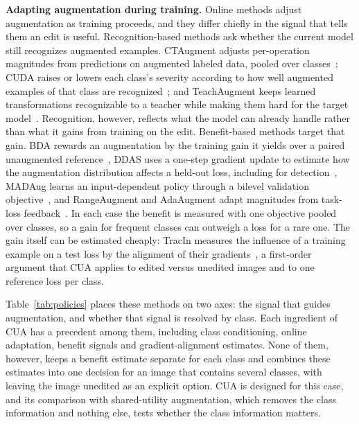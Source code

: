 \documentclass[conference]{IEEEtran}
\begin{document}
\noindent\textbf{Adapting augmentation during training.} Online methods adjust augmentation as training proceeds, and they differ chiefly in the signal that tells them an edit is useful. Recognition-based methods ask whether the current model still recognizes augmented examples. CTAugment adjusts per-operation magnitudes from predictions on augmented labeled data, pooled over classes~\cite{berthelot2020}; CUDA raises or lowers each class's severity according to how well augmented examples of that class are recognized~\cite{ahn2023cuda}; and TeachAugment keeps learned transformations recognizable to a teacher while making them hard for the target model~\cite{suzuki2022teach}. Recognition, however, reflects what the model can already handle rather than what it gains from training on the edit. Benefit-based methods target that gain. BDA rewards an augmentation by the training gain it yields over a paired unaugmented reference~\cite{lu2023bda}, DDAS uses a one-step gradient update to estimate how the augmentation distribution affects a held-out loss, including for detection~\cite{liu2021ddas}, MADAug learns an input-dependent policy through a bilevel validation objective~\cite{hou2023madaug}, and RangeAugment and AdaAugment adapt magnitudes from task-loss feedback~\cite{mehta2022rangeaugment,yang2025adaaugment}. In each case the benefit is measured with one objective pooled over classes, so a gain for frequent classes can outweigh a loss for a rare one. The gain itself can be estimated cheaply: TracIn measures the influence of a training example on a test loss by the alignment of their gradients~\cite{pruthi2020tracin}, a first-order argument that CUA applies to edited versus unedited images and to one reference loss per class.

Table~\ref{tab:policies} places these methods on two axes: the signal that guides augmentation, and whether that signal is resolved by class. Each ingredient of CUA has a precedent among them, including class conditioning, online adaptation, benefit signals and gradient-alignment estimates. None of them, however, keeps a benefit estimate separate for each class and combines these estimates into one decision for an image that contains several classes, with leaving the image unedited as an explicit option. CUA is designed for this case, and its comparison with shared-utility augmentation, which removes the class information and nothing else, tests whether the class information matters.
\end{document}
